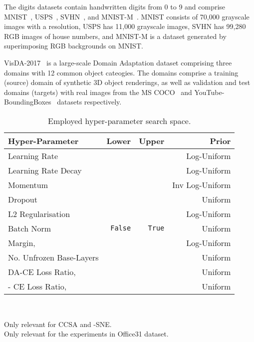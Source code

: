 \documentclass[journal]{IEEEtran}
\begin{document}
The digits datasets contain handwritten digits from 0 to 9 and comprise MNIST~\cite{lecun1998gradient}, USPS~\cite{lecun90handwritten}, SVHN~\cite{netzer2011reading}, and MNIST-M~\cite{ganin2016domain}. 
MNIST consists of 70,000 grayscale images with a  resolution, USPS has 11,000  grayscale images, SVHN has 99,280 RGB images of house numbers, and MNIST-M is a dataset generated by superimposing RGB backgrounds on MNIST.

VisDA-2017~\cite{peng2018visda} is a large-scale Domain Adaptation dataset comprising three domains with 12 common object cateogies. The domains comprise a training (source) domain of synthetic 3D object renderings, as well as validation and test domains (targets) with real images from the MS COCO~\cite{tsungyi2014coco} and YouTube-BoundingBoxes~\cite{real2017youtube} datasets respectively.

\begin{table}
	\begin{center}
	\caption{Employed hyper-parameter search space.}
	\label{tab:search-space}
	\begin{tabular}{lrrr}
		\toprule
        Hyper-Parameter 
		    & Lower
		    & Upper
		    & Prior
            \\
		\midrule
		Learning Rate
    		& 
    		& 	
    		& Log-Uniform
    		\\
	    Learning Rate Decay
    	    & 
    		& 
    		& Log-Uniform
    		\\
        Momentum 
            & 
    		& 
    		& Inv Log-Uniform
    		\\
    	Dropout
            & 
    		& 
    		& Uniform
    		\\
    	L2 Regularisation
            & 
    		& 
    		& Log-Uniform
    		\\
    	Batch Norm
            & \texttt{False}
    		& \texttt{True}
    		& Uniform
    		\\
    	Margin,  \textsuperscript{\textsection}
            & 
    		& 
    		& Log-Uniform
    		\\
    	No. Unfrozen Base-Layers \textsuperscript{\textparagraph}
            & 
    		& 
    		& Uniform
    		\\
    	DA-CE Loss Ratio,  
            & 
    		& 	
    		& Uniform	
    		\\
    	- CE Loss Ratio, 
            & 
    		& 
    		& Uniform
    		\\
		\bottomrule
	\end{tabular}\\
	\end{center}
	\textsuperscript{\textsection}Only relevant for CCSA and -SNE.\\
	\textsuperscript{\textparagraph}Only relevant for the experiments in Office31 dataset.
\end{table}
\end{document}
